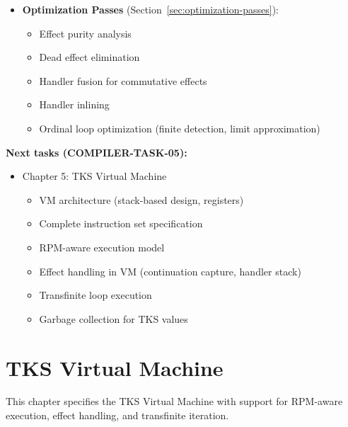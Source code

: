 \begin{tcolorbox}[colback=green!5!white,colframe=green!50!black,title=\textbf{Handoff: COMPILER-TASK-04 Complete},breakable]
\begin{itemize}
\begin{itemize}
      \item \textbf{Theorem~\ref{thm:ir-typing-preservation}}: IR preserves typing judgments
      \item v7.2 backwards compatibility corollary
    \end{itemize}
  \item \textbf{Optimization Passes} (Section~\ref{sec:optimization-passes}):
    \begin{itemize}
      \item Effect purity analysis
      \item Dead effect elimination
      \item Handler fusion for commutative effects
      \item Handler inlining
      \item Ordinal loop optimization (finite detection, limit approximation)
    \end{itemize}
\end{itemize}

\textbf{Next tasks (COMPILER-TASK-05):}
\begin{itemize}
  \item Chapter 5: TKS Virtual Machine
    \begin{itemize}
      \item VM architecture (stack-based design, registers)
      \item Complete instruction set specification
      \item RPM-aware execution model
      \item Effect handling in VM (continuation capture, handler stack)
      \item Transfinite loop execution
      \item Garbage collection for TKS values
    \end{itemize}
\end{itemize}
\end{tcolorbox}

\chapter{TKS Virtual Machine}
\label{ch:tks-vm}

\begin{tcolorbox}[colback=blue!5!white,colframe=blue!75!black,title=\vnewthree]
This chapter specifies the TKS Virtual Machine with support for RPM-aware execution, effect handling, and transfinite iteration.
\end{tcolorbox}

